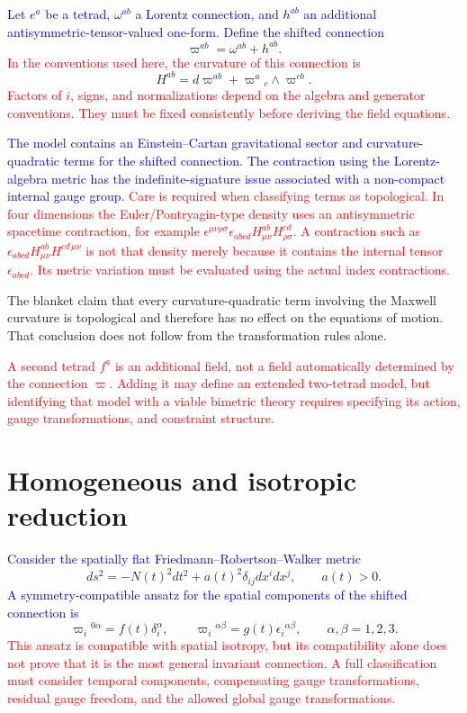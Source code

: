\documentclass[prd,reprint,eqsecnum,nofootinbib]{revtex4-1}
\newcommand{\lang}[1]{\textcolor{blue}{#1}}
\newcommand{\science}[1]{\textcolor{red}{#1}}
\newcommand{\cut}[1]{\textcolor{green!45!black}{#1}}
\begin{document}
\lang{Let $e^a$ be a tetrad, $\omega^{ab}$ a Lorentz connection, and $h^{ab}$ an additional antisymmetric-tensor-valued one-form. Define the shifted connection}
\begin{equation}
  \varpi^{ab}=\omega^{ab}+h^{ab}.
\end{equation}
\science{In the conventions used here, the curvature of this connection is}
\begin{equation}
  H^{ab}=d\varpi^{ab}+\varpi^a{}_c\wedge\varpi^{cb}.
\end{equation}
\science{Factors of $i$, signs, and normalizations depend on the algebra and generator conventions. They must be fixed consistently before deriving the field equations.}

\lang{The model contains an Einstein--Cartan gravitational sector and curvature-quadratic terms for the shifted connection. The contraction using the Lorentz-algebra metric has the indefinite-signature issue associated with a non-compact internal gauge group.}
\science{Care is required when classifying terms as topological. In four dimensions the Euler/Pontryagin-type density uses an antisymmetric spacetime contraction, for example
$\epsilon^{\mu\nu\rho\sigma}\epsilon_{abcd}
H^{ab}_{\mu\nu}H^{cd}_{\rho\sigma}$.
A contraction such as
$\epsilon_{abcd}H^{ab}_{\mu\nu}H^{cd\,\mu\nu}$
is not that density merely because it contains the internal tensor
$\epsilon_{abcd}$. Its metric variation must be evaluated using the actual index contractions.}

\cut{The blanket claim that every curvature-quadratic term involving the Maxwell curvature is topological and therefore has no effect on the equations of motion. That conclusion does not follow from the transformation rules alone.}

\science{A second tetrad $f^a$ is an additional field, not a field automatically determined by the connection $\varpi$. Adding it may define an extended two-tetrad model, but identifying that model with a viable bimetric theory requires specifying its action, gauge transformations, and constraint structure.}

\section{Homogeneous and isotropic reduction}

\lang{Consider the spatially flat Friedmann--Robertson--Walker metric}
\begin{equation}
  ds^2=-N(t)^2dt^2+a(t)^2\delta_{ij}dx^i dx^j,
  \qquad a(t)>0.
\end{equation}
\lang{A symmetry-compatible ansatz for the spatial components of the shifted connection is}
\begin{equation}
  \varpi_i{}^{0\alpha}=f(t)\delta_i^\alpha,
  \qquad
  \varpi_i{}^{\alpha\beta}=g(t)\epsilon_i{}^{\alpha\beta},
  \qquad \alpha,\beta=1,2,3.
\end{equation}
\science{This ansatz is compatible with spatial isotropy, but its compatibility alone does not prove that it is the most general invariant connection. A full classification must consider temporal components, compensating gauge transformations, residual gauge freedom, and the allowed global gauge transformations.}
\end{document}
